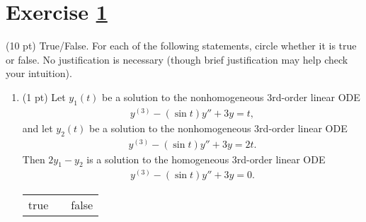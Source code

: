%
%
%
%


\section{Exercise \ref{sec : Math211 Summer2019 Exam4 Q1}}
\label{sec : Math211 Summer2019 Exam4 Q1}

(10 pt) True/False. For each of the following statements, circle whether it is true or false. No justification is necessary (though brief justification may help check your intuition).
\begin{enumerate}[label=(\alph*)]
\item\label{itm : E4Q1a} (1 pt) Let $y_{1}(t)$ be a solution to the nonhomogeneous 3rd-order linear ODE
\begin{align}
y^{(3)} - (\sin t) y'' + 3 y
=
t,%
\label{eq : E4Q1a y1}
\end{align}
and let $y_{2}(t)$ be a solution to the nonhomogeneous 3rd-order linear ODE
\begin{align}
y^{(3)} - (\sin t) y'' + 3 y
=
2 t.%
\label{eq : E4Q1a y2}
\end{align}
Then $2 y_{1} - y_{2}$ is a solution to the homogeneous 3rd-order linear ODE
\begin{align*}
y^{(3)} - (\sin t) y'' + 3 y
=
0.
\end{align*}
\begin{center}
\begin{tabular}{c c c}
true	&	\hspace{1in}	&	false
\end{tabular}
\end{center}
\end{enumerate}




